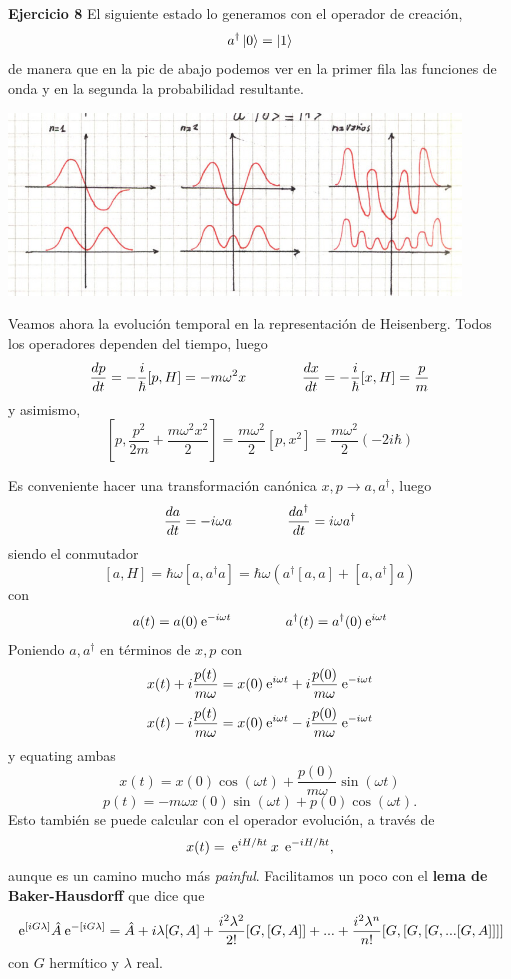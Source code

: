 \documentclass[10pt,oneside]{CBFT_book}
\begin{document}
\begin{ejemplo}{\bf Ejercicio 8}
El siguiente estado lo generamos con el operador de creación,
\[
	a^\dagger \Ket{0} = \Ket{1}
\]
de manera que en la pic de abajo podemos ver en la primer fila las funciones de
onda y en la segunda la probabilidad resultante.

\includegraphics[width=0.9\textwidth]{images/fig_ft2_osc_arm_gaussiana_plancha.jpg}

 
Veamos ahora la evolución temporal en la representación de Heisenberg. Todos los operadores
dependen del tiempo, luego
\[
	\frac{d^{\hspace{-0.05em}} {p}}{d {t}^{\hspace{-0.05em}}} = -\frac{i}{\hbar}[p,H] = -m \omega^2 x \qquad \qquad 
	\frac{d^{\hspace{-0.05em}} {x}}{d {t}^{\hspace{-0.05em}}} = -\frac{i}{\hbar}[x,H] = \frac{p}{m}
\]
y asimismo,
\[
	[p, \frac{p^2}{2m} + \frac{m\omega^2 x^2}{2}] = \frac{m \omega^2}{2} [p,x^2] =
	\frac{m\omega^2}{2}(-2 i \hbar )
\]

Es conveniente hacer una transformación canónica $x,p \to a,a^\dagger$, luego
\[
	\frac{d^{\hspace{-0.05em}} {a}}{d {t}^{\hspace{-0.05em}}} = - i \omega a \qquad \qquad 
	\frac{d^{\hspace{-0.05em}} {a^\dagger}}{d {t}^{\hspace{-0.05em}}} =  i \omega a^\dagger
\]
siendo el conmutador
\[
	[a,H] = \hbar \omega [a,a^\dagger a] = 
	\hbar\omega ( a^\dagger [ a, a ] + [ a, a^\dagger ] a )
\]
con
\[
	a(t) = a(0) \:\mathrm{e}^{ - i \omega t } \qquad \qquad 
	a^\dagger(t) = a^\dagger(0) \:\mathrm{e}^{ i \omega t }
\]
Poniendo $a,a^\dagger$ en términos de $x, p$ con
\[
	x(t) + i \frac{p(t)}{m\omega} = 
	x(0)\:\mathrm{e}^{i\omega t} + i \frac{p(0)}{m\omega}\:\mathrm{e}^{-i\omega t}
\]
\[
	x(t) - i \frac{p(t)}{m\omega} = 
	x(0)\:\mathrm{e}^{i\omega t} - i \frac{p(0)}{m\omega}\:\mathrm{e}^{-i\omega t}
\]
y equating ambas
\[
	x(t) = x(0)\cos(\omega t) + \frac{p(0)}{m\omega} \sin(\omega t)
\]
\[
	p(t) = - m \omega x(0)\sin(\omega t) + p(0) \cos(\omega t).
\]
Esto también se puede calcular con el operador evolución, a través de
\[
	x(t) = \:\mathrm{e}^{i H / \hbar t} \: x \: \:\mathrm{e}^{-i H / \hbar t},
\]
aunque es un camino mucho más {\it painful}.
Facilitamos un poco con el {\bf lema de Baker-Hausdorff} que dice que
\[
	\:\mathrm{e}^{[iG\lambda]} \hat{A} \:\mathrm{e}^{-[iG\lambda]} =
	\hat{A} + i \lambda [G,A] + \frac{i^2\lambda^2}{2!}[ G, [G,A ] ] + ... +
	\frac{i^2\lambda^n}{n!} [ G, [ G, [ G, ... [G,A] ] ] ]
\]
con $G$ hermítico y $\lambda$ real.


\end{ejemplo}
\end{document}
